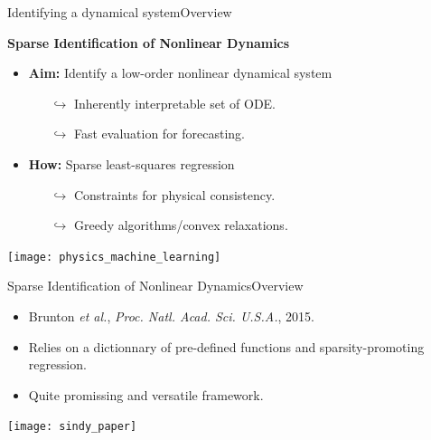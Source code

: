 \begin{frame}[t, c]{Identifying a dynamical system}{Overview}
  \begin{minipage}{.48\textwidth}
    \begin{block}{}
      \centering
      \textbf{Sparse Identification of Nonlinear Dynamics}
    \end{block}
    
    \medskip
    
    \begin{itemize}
    \item \textbf{Aim:} Identify a low-order nonlinear dynamical system
      \begin{itemize}
      \item[\(	\hookrightarrow	\)] Inherently interpretable set of ODE.
      \item[\(	\hookrightarrow	\)] Fast evaluation for forecasting.
      \end{itemize}
      
      \medskip
      
    \item \textbf{How:} Sparse least-squares regression
      \begin{itemize}
      \item[\(	\hookrightarrow	\)] Constraints for physical consistency.
      \item[\(	\hookrightarrow	\)] Greedy algorithms/convex relaxations.
      \end{itemize}
    \end{itemize}
  \end{minipage}%
  \hfill
  \begin{minipage}{.48\textwidth}
    \centering
    \texttt{[image: physics\_machine\_learning]}
  \end{minipage}
  
  \vspace{1cm}
\end{frame}

\begin{frame}[t, c]{Sparse Identification of Nonlinear Dynamics}{Overview}
  \begin{minipage}{.48\textwidth}
    \begin{itemize}
    \item Brunton \emph{et al.}, \emph{Proc. Natl. Acad. Sci. U.S.A.}, 2015.
      
      \medskip
      
    \item Relies on a dictionnary of pre-defined functions and sparsity-promoting regression.
      
      \medskip
      
    \item Quite promissing and versatile framework.
    \end{itemize}
  \end{minipage}%
  \hfill
  \begin{minipage}{.48\textwidth}
    \centering
    \texttt{[image: sindy\_paper]}
  \end{minipage}
  
  \vspace{1cm}
\end{frame}

